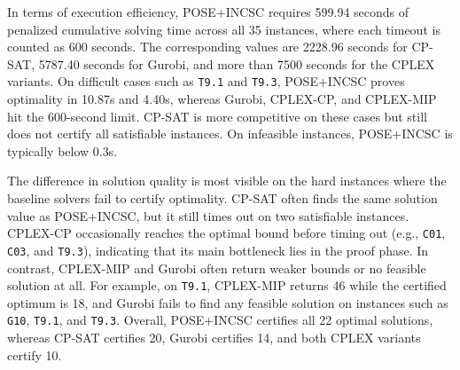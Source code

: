 \documentclass[letterpaper,journal]{IEEEtran}
\begin{document}
In terms of execution efficiency, POSE+INCSC requires 599.94 seconds of penalized cumulative solving time across all 35 instances, where each timeout is counted as 600 seconds. The corresponding values are 2228.96 seconds for CP-SAT, 5787.40 seconds for Gurobi, and more than 7500 seconds for the CPLEX variants. On difficult cases such as \texttt{T9.1} and \texttt{T9.3}, POSE+INCSC proves optimality in 10.87s and 4.40s, whereas Gurobi, CPLEX-CP, and CPLEX-MIP hit the 600-second limit. CP-SAT is more competitive on these cases but still does not certify all satisfiable instances. On infeasible instances, POSE+INCSC is typically below 0.3s.

The difference in solution quality is most visible on the hard instances where the baseline solvers fail to certify optimality. CP-SAT often finds the same solution value as POSE+INCSC, but it still times out on two satisfiable instances. CPLEX-CP occasionally reaches the optimal bound before timing out (e.g., \texttt{C01}, \texttt{C03}, and \texttt{T9.3}), indicating that its main bottleneck lies in the proof phase. In contrast, CPLEX-MIP and Gurobi often return weaker bounds or no feasible solution at all. For example, on \texttt{T9.1}, CPLEX-MIP returns 46 while the certified optimum is 18, and Gurobi fails to find any feasible solution on instances such as \texttt{G10}, \texttt{T9.1}, and \texttt{T9.3}. Overall, POSE+INCSC certifies all 22 optimal solutions, whereas CP-SAT certifies 20, Gurobi certifies 14, and both CPLEX variants certify 10.



\end{document}

